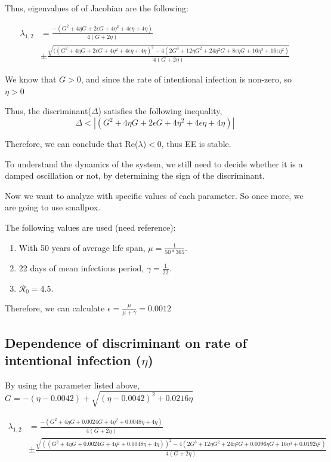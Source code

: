\documentclass[12pt]{article}
\newcommand{\R}{\mathcal{R}}
\begin{document}
Thus, eigenvalues of of Jacobian are the following:

\begin{align}
\lambda_{1,2} &= \frac{-(G^2+4\eta G+2\epsilon G+4\eta^2+4\epsilon\eta+4\eta) }{4(G+2\eta)}\\
& \pm \frac{\sqrt{((G^2+4\eta G+2\epsilon G+4\eta^2+4\epsilon\eta+4\eta)^2-4(2G^3+12\eta G^2+24\eta^2 G+8\epsilon\eta G+16\eta^3+16\epsilon\eta^2)}}{4(G+2\eta)}
\end{align}

We know that $G>0$, and since the rate of intentional infection is non-zero, so $\eta >0$

Thus, the discriminant($\Delta$) satisfies the following inequality,
\begin{equation}
\Delta<|(G^2+4\eta G+2\epsilon G+4\eta^2+4\epsilon\eta+4\eta)|
\end{equation}

Therefore, we can conclude that Re($\lambda$)$<0$, thus EE is stable.

To understand the dynamics of the system, we still need to decide whether it is a damped oscillation or not, by determining the sign of the discriminant.

Now we want to analyze with specific values of each parameter. So once more, we are going to use smallpox.

The following values are used (need reference): 
\begin{enumerate}
\item With 50 years of average life span, $\mu=\frac{1}{50*365}$.
\item 22 days of mean infectious period, $\gamma=\frac{1}{22}$.
\item $\R_0=4.5$.
\end{enumerate}
Therefore, we can calculate $\epsilon=\frac{\mu}{\mu+\gamma}=0.0012$

\subsection{Dependence of discriminant on rate of intentional infection ($\eta$)}

By using the parameter listed above, $G=-(\eta-0.0042)+\sqrt{(\eta-0.0042)^2+0.0216\eta}$

\begin{align}
\lambda_{1,2} &= \frac{-(G^2+4\eta G+0.0024 G+4\eta^2+0.0048\eta+4\eta) }{4(G+2\eta)}\\
& \pm \frac{\sqrt{((G^2+4\eta G+0.0024 G+4\eta^2+0.0048\eta+4\eta))^2-4(2G^3+12\eta G^2+24\eta^2 G+0.0096\eta G+16\eta^3+0.0192\eta^2)}}{4(G+2\eta)}
\end{align}
\end{document}
